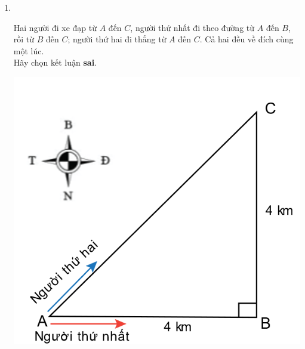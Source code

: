 \begin{enumerate}[label=\bfseries Câu \arabic*:]
\item {}\\
{\begin{minipage}[l]{0.7\textwidth}
		Hai người đi xe đạp từ $A$ đến $C$, người thứ nhất đi theo đường từ $A$ đến $B$, rồi từ $B$ đến $C$; người thứ hai đi thẳng từ $A$ đến $C$. Cả hai đều về đích cùng một lúc.\\
		Hãy chọn kết luận \textbf{sai}.
	\end{minipage}
\begin{minipage}{0.3\textwidth}
	\begin{center}
		\includegraphics[width=0.9\linewidth]{../figs/VN10-2022-PH-TP004-P-3}
	\end{center}
\end{minipage}

}


\end{enumerate}
